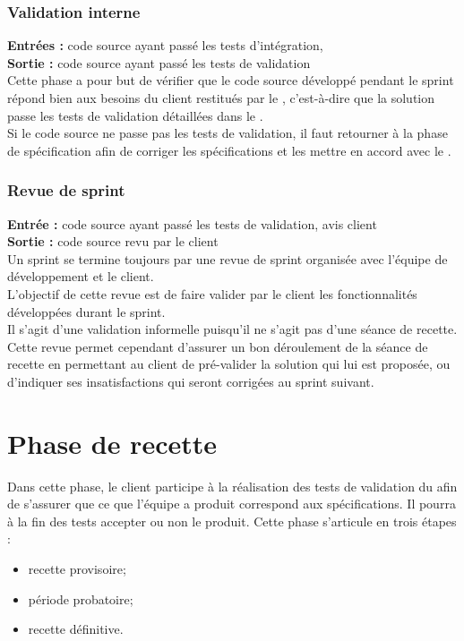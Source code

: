 \subsubsection{Validation interne}

\textbf{Entrées :} code source ayant passé les tests d’intégration, \PTVCourt \\
\textbf{Sortie : } code source ayant passé les tests de validation \\
Cette phase a pour but de vérifier que le code source développé pendant le sprint répond bien aux besoins du client restitués par le \DSECourt, c’est-à-dire que la solution passe les tests de validation détaillées dans le \PTVCourt .\\
Si le code source ne passe pas les tests de validation, il faut retourner à la phase de spécification afin de corriger les spécifications et les mettre en accord avec le \DSECourt.

\subsubsection{Revue de sprint}
\textbf{Entrée :} code source ayant passé les tests de validation, avis client \\
\textbf{Sortie :} code source revu par le client \\

Un sprint se termine toujours par une revue de sprint organisée avec l’équipe de développement et le client. \\
L’objectif de cette revue est de faire valider par le client les fonctionnalités développées durant le sprint.\\ 
Il s’agit d’une validation informelle puisqu’il ne s’agit pas d’une séance de
recette. Cette revue permet cependant d’assurer un bon déroulement de la séance de recette en permettant au client de pré-valider la solution qui lui est proposée, ou d’indiquer ses insatisfactions qui seront corrigées au sprint suivant. \\


\section{Phase de recette}
\label{recette}

Dans cette phase, le client participe à la réalisation des tests de validation du \PTV{} afin de s’assurer que ce que l’équipe a produit correspond aux spécifications. Il pourra à la fin des tests accepter ou non le produit.
Cette phase s’articule en trois étapes : 
\begin{itemize}
\item recette provisoire;
\item période probatoire; 
\item recette définitive.
\end{itemize}

